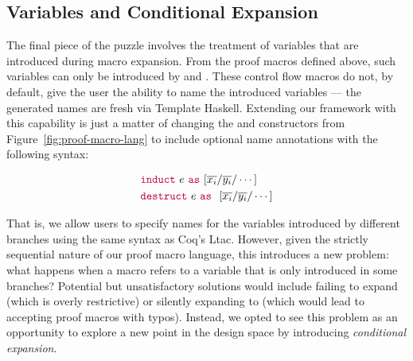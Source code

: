 
\subsection{Variables and Conditional Expansion}

The final piece of the puzzle involves the treatment of variables that
are introduced during macro expansion. From the proof macros defined
above, such variables can only be introduced by  and
. These control flow macros do not, by default, give the
user the ability to name the introduced variables --- the generated
names are fresh via Template Haskell. Extending our framework with
this capability is just a matter of changing the  and
 constructors from Figure~\ref{fig:proof-macro-lang}
to include optional name annotations with the following syntax:

\begin{align*}
  & {\color{purple}\mathtt{induct}} ~ e ~ {\color{purple}\mathtt{as}} ~ \mathtt{[} \overline{x_i} / \overline{y_i} / \cdots \mathtt{]}\\
  & {\color{purple}\mathtt{destruct}} ~ e ~ {\color{purple}\mathtt{as}} ~ ~ \mathtt{[} \overline{x_i} / \overline{y_i} / \cdots \mathtt{]}
\end{align*}

That is, we allow users to specify names for the variables introduced
by different branches using the same syntax as Coq's Ltac. However,
given the strictly sequential nature of our proof macro language, this
introduces a new problem: what happens when a macro refers to a
variable that is only introduced in some branches? Potential but
unsatisfactory solutions would include failing to expand (which is
overly restrictive) or silently expanding to  (which would
lead to accepting proof macros with typos). Instead, we opted to see
this problem as an opportunity to explore a new point in the design
space by introducing {\em conditional expansion}.

